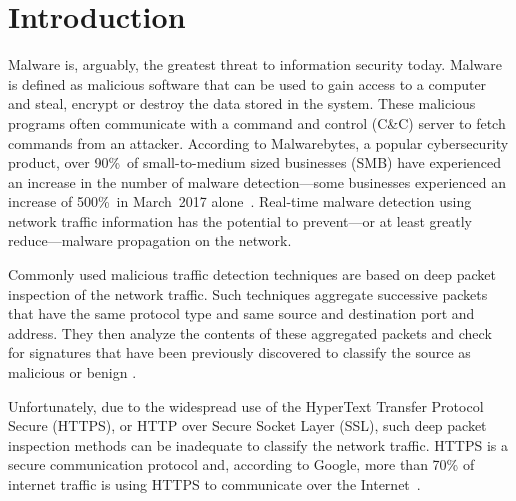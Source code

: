 \chapter{Introduction\label{chap:intro}}

Malware is, arguably, the greatest threat to information security today. Malware is defined as malicious software that can be used to gain access to a computer and steal, encrypt or destroy the data stored in the system. These malicious programs often communicate with a command and control (C\&C) server to fetch commands from an attacker. According to Malwarebytes, a popular cybersecurity product, over 90\%\ of small-to-medium sized businesses (SMB) have experienced an increase in the number of malware detection---some businesses experienced an increase of 500\%\  in
 March~2017 alone~\cite{Malwarebytes17}. Real-time malware detection using network traffic information has the potential to prevent---or at least greatly reduce---malware propagation on the network.

Commonly used malicious traffic detection techniques are based on deep packet inspection of the network traffic. 
Such techniques aggregate successive packets that have the same protocol type and same source and destination port and address. They then analyze the contents of these aggregated packets and check for signatures that have been 
previously discovered to classify the source as malicious or benign \cite{SenSW04}.

Unfortunately, due to the widespread use of the HyperText Transfer Protocol Secure (HTTPS), or HTTP over Secure Socket Layer (SSL), such deep packet inspection methods can be inadequate to classify the network traffic. HTTPS is a secure communication protocol and, according to Google, more than 70\% of internet traffic is using HTTPS to communicate over the Internet~\cite{Google17}. 

